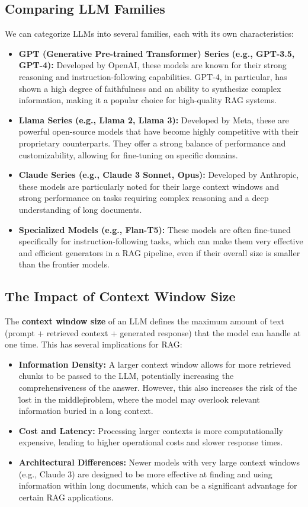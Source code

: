 \subsection{Comparing LLM Families}
We can categorize LLMs into several families, each with its own characteristics:
\begin{itemize}
    \item \textbf{GPT (Generative Pre-trained Transformer) Series (e.g., GPT-3.5, GPT-4):} Developed by OpenAI, these models are known for their strong reasoning and instruction-following capabilities. GPT-4, in particular, has shown a high degree of faithfulness and an ability to synthesize complex information, making it a popular choice for high-quality RAG systems.
    \item \textbf{Llama Series (e.g., Llama 2, Llama 3):} Developed by Meta, these are powerful open-source models that have become highly competitive with their proprietary counterparts. They offer a strong balance of performance and customizability, allowing for fine-tuning on specific domains.
    \item \textbf{Claude Series (e.g., Claude 3 Sonnet, Opus):} Developed by Anthropic, these models are particularly noted for their large context windows and strong performance on tasks requiring complex reasoning and a deep understanding of long documents.
    \item \textbf{Specialized Models (e.g., Flan-T5):} These models are often fine-tuned specifically for instruction-following tasks, which can make them very effective and efficient generators in a RAG pipeline, even if their overall size is smaller than the frontier models.
\end{itemize}

\subsection{The Impact of Context Window Size}
The \textbf{context window size} of an LLM defines the maximum amount of text (prompt + retrieved context + generated response) that the model can handle at one time. This has several implications for RAG:
\begin{itemize}
    \item \textbf{Information Density:} A larger context window allows for more retrieved chunks to be passed to the LLM, potentially increasing the comprehensiveness of the answer. However, this also increases the risk of the \"lost in the middle\" problem, where the model may overlook relevant information buried in a long context.
    \item \textbf{Cost and Latency:} Processing larger contexts is more computationally expensive, leading to higher operational costs and slower response times.
    \item \textbf{Architectural Differences:} Newer models with very large context windows (e.g., Claude 3) are designed to be more effective at finding and using information within long documents, which can be a significant advantage for certain RAG applications.
\end{itemize}

